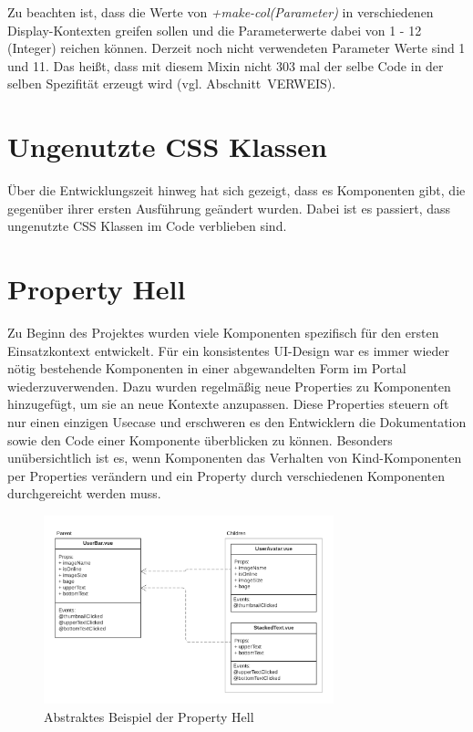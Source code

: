 Zu beachten ist, dass die Werte von \textit{+make-col(Parameter)} in verschiedenen Display-Kontexten greifen sollen und die Parameterwerte dabei von 1 - 12 (Integer) reichen können. Derzeit noch nicht verwendeten Parameter Werte sind 1 und 11. Das heißt, dass mit diesem Mixin nicht 303 mal der selbe Code in der selben Spezifität erzeugt wird (vgl. Abschnitt~VERWEIS).
 
\section{Ungenutzte CSS Klassen}
\label{sec:unusedCSS}
Über die Entwicklungszeit hinweg hat sich gezeigt, dass es Komponenten gibt, die gegenüber ihrer ersten Ausführung geändert wurden. Dabei ist es passiert, dass ungenutzte CSS Klassen im Code verblieben sind.

\section{Property Hell}
\label{sec:propertyHell}
Zu Beginn des Projektes wurden viele Komponenten spezifisch für den ersten Einsatzkontext entwickelt. Für ein konsistentes UI-Design war es immer wieder nötig bestehende Komponenten in einer abgewandelten Form im Portal wiederzuverwenden. Dazu wurden regelmäßig neue Properties zu Komponenten hinzugefügt, um sie an neue Kontexte anzupassen. Diese Properties steuern oft nur einen einzigen Usecase und erschweren es den Entwicklern die Dokumentation sowie den Code einer Komponente überblicken zu können. Besonders unübersichtlich ist es, wenn Komponenten das Verhalten von Kind-Komponenten per Properties verändern und ein Property durch verschiedenen Komponenten durchgereicht werden muss.

\begin{figure}[!ht]
	\centering
		\includegraphics[width=0.75\textwidth]{images/003-000-001-property-hell.png}
	\caption{Abstraktes Beispiel der Property Hell}
	\label{fig:propertyHell}
\end{figure}

